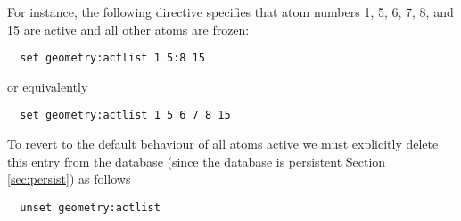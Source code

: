 For instance, the following directive specifies that atom numbers 1,
5, 6, 7, 8, and 15 are active and all other atoms are frozen:
\begin{verbatim}
  set geometry:actlist 1 5:8 15
\end{verbatim}
or equivalently
\begin{verbatim}
  set geometry:actlist 1 5 6 7 8 15
\end{verbatim}


To revert to the default behaviour of all atoms active we
must explicitly delete this entry from the database (since
the database is persistent Section \ref{sec:persist}) as follows
\begin{verbatim}
  unset geometry:actlist
\end{verbatim}




